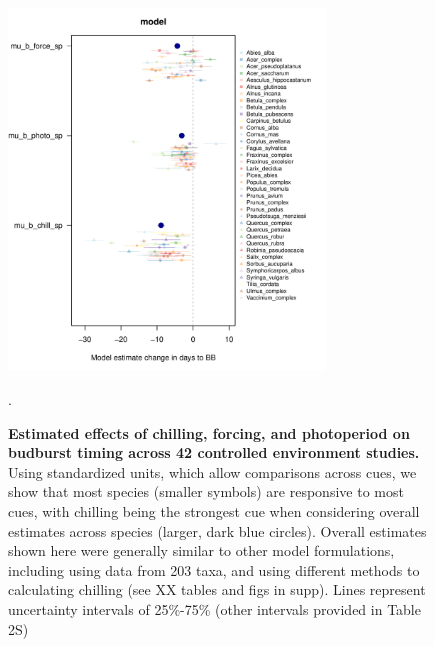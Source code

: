\documentclass{article}
\begin{document}
\begin{figure}[h!]
\centering
\noindent \includegraphics[width=0.75\textwidth]{..//..//analyses/bb_analysis/figures/muplotmodelspcompexprampfputah_z.pdf}
\caption{\textbf{Estimated effects of chilling, forcing, and photoperiod on budburst timing across 42 controlled environment studies.} Using standardized units, which  allow comparisons across cues, we show that most species (smaller symbols) are responsive to most cues, with chilling being the strongest cue when considering overall estimates across species (larger, dark blue circles). Overall estimates shown here were generally similar to other model formulations, including using data from 203 taxa, and using different methods to calculating chilling (see XX tables and figs in supp). Lines represent uncertainty intervals of 25\%-75\% (other intervals provided in Table 2S)}.
\label{fig:mu}
\end{figure}

\newpage
\end{document}
